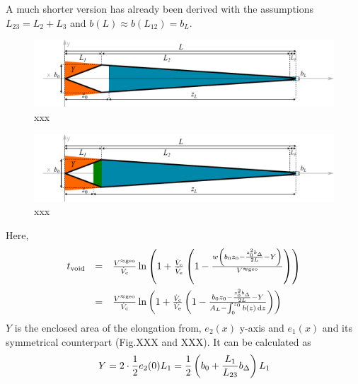 A much shorter version has already been derived  with the assumptions $L_{23} = L_2 
+ L_3$ and $b(L) \approx b(L_{12}) = b_L$.
\begin{figure}[h]
  \begin{center}
    \includegraphics[width=\linewidth]{./images/fffApprox1.pdf}
    \vspace*{-3ex}    
  \end{center}
  \caption[Passed area section - distal focussing, simplified approximation]{xxx}
  \label{fig:fffApprox1} 
\end{figure}
\begin{figure}[h]
  \begin{center}
    \includegraphics[width=\linewidth]{./images/fffApprox2.pdf}
    \vspace*{-3ex}    
  \end{center}
  \caption[Passed area section - distal focussing, simplified approximation]{xxx}
  \label{fig:fffApprox1} 
\end{figure}

Here, 
\begin{equation}
\begin{array}{lll}
\tvoid &= & \frac{\Vappgeo}{\Vc} \ln{
  \left(
  1 + \frac{\Vc}{\Ve}
  \left(
  1 - \frac{
    w 
    \left(
    b_0 z_0 
    - \frac{
      z_0^2 \bDelta
    }{
      2L} 
    - Y
    \right)
  }{\Vappgeo}
  \right)
  \right)}
\\\addlinespace
&= &\frac{\Vappgeo}{\Vc} \ln{
  \left(
  1 + \frac{\Vc}{\Ve}
  \left(
  1 - \frac{
    b_0 z_0 
    - \frac{
      z_0^2 \bDelta
    }{
      2L
    } 
    -  Y
  }{
  A_L -  \int_{0}^{z_0} b(z) \diff z
}
  \right)
  \right)}
\end{array}
\end{equation}
$Y$ is the enclosed area of the elongation from,
$e_2(x)$ y-axis and $e_1(x)$ and its symmetrical counterpart (Fig.XXX and XXX). 
It can be calculated as 
\begin{equation}
Y = 2 \cdot \frac{1}{2} e_2(0) L_1 = \frac{1}{2}\left( b_0 + \frac{L_1}{L_{23}} b_\Delta \right) L_1
\end{equation}
